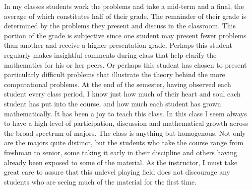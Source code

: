 \begin{annotation}
In my classes students work the problems and take a mid-term and a final, the average of which constitutes half of their grade. The remainder of their grade is determined by the problems they present and discuss in the classroom.   This portion of the grade is subjective since one student may present fewer problems than another and receive a higher presentation grade.  Perhaps this student regularly makes insightful comments during class that help clarify the mathematics for his or her peers.  Or perhaps this student has chosen to present particularly difficult problems that illustrate the theory behind the more computational problems.  At the end of the semester, having observed each student every class period, I know just how much of their heart and soul each student has put into the course, and how much each student has grown mathematically.  It has been a joy to teach this class.
In this class I seem always to have a high level of participation, discussion and mathematical growth across the broad spectrum of majors.  The class is anything but homogenous.  Not only are the majors quite distinct, but the students who take the course range from freshman to senior, some taking it early in their discipline and others having already been exposed to some of the material.  As the instructor, I must take great care to assure that this unlevel playing field does not discourage any students who are seeing much of the material for the first time.


\end{annotation}

